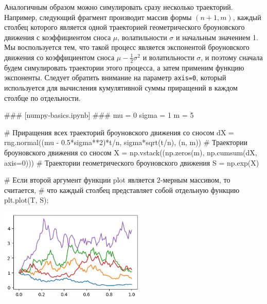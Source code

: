 Аналогичным образом можно симулировать сразу несколько траекторий.
Например, следующий фрагмент производит массив формы $(n+1, m)$, каждый столбец которого является одной траекторией геометрического броуновского движения с коэффициентом сноса $\mu$, волатильности $\sigma$ и начальным значением 1.
Мы воспользуется тем, что такой процесс является экспонентой броуновского движения со коэффициентом сноса $\mu-\frac12 \sigma^2$ и волатильности $\sigma$, и поэтому сначала будем симулировать траектории этого процесса, а затем применим функцию экспоненты. 
Следует обратить внимание на параметр \verb"axis=0", который используется для вычисления кумулятивной суммы приращений в каждом столбце по отдельности.

\begin{python}
### [numpy-basics.ipynb] ###
mu = 0
sigma = 1
m = 5

# Приращения всех траекторий броуновского движения со сносом
dX = rng.normal((mu - 0.5*sigma**2)*t/n, sigma*sqrt(t/n), (n, m))  
# Траектории броуновского движения со сносом
X = np.vstack((np.zeros(m), np.cumsum(dX, axis=0)))
# Траектории геометрического броуновского движения
S = np.exp(X)

# Если второй аргумент функции plot является 2-мерным массивом, то считается,
# что каждый столбец представляет собой отдельную функцию
plt.plot(T, S);
\end{python}

\noindent
\includegraphics[width=7cm]{pic/gbm-paths.png}
